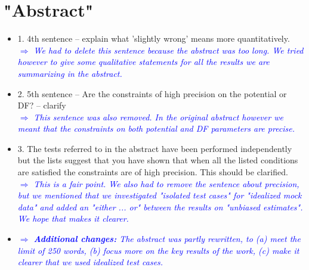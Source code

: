 \documentclass[10pt,a4paper]{article}
\newcommand{\Comment}[1]{\textsl{\textcolor{Blue}{$\Longrightarrow$ {#1}}}}
\begin{document}
\section{"Abstract"}
\begin{itemize}
\item 1. 4th sentence -- explain what 'slightly wrong' means more quantitatively. \\\Comment{We had to delete this sentence because the abstract was too long. We tried however to give some qualitative statements for all the results we are summarizing in the abstract.}
\item 2. 5th sentence -- Are the constraints of high precision on the potential or DF? -- clarify \\\Comment{This sentence was also removed. In the original abstract however we meant that the constraints on both potential and DF parameters are precise.}
\item 3. The tests referred to in the abstract have been performed independently but the lists suggest that you have shown that when all the listed conditions are satisfied the constraints are of high precision. This should be clarified. \\\Comment{This is a fair point. We also had to remove the sentence about precision, but we mentioned that we investigated "isolated test cases" for "idealized mock data" and added an "either ... or" between the results on "unbiased estimates". We hope that makes it clearer.}
\item \Comment{\textbf{Additional changes:} The abstract was partly rewritten, to (a) meet the limit of 250 words, (b) focus more on the key results of the work, (c) make it clearer that we used idealized test cases.}
\end{itemize}
\end{document}
